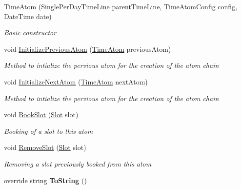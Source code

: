 \begin{DoxyCompactItemize}
\item 
\hyperlink{class_general_health_care_elements_1_1_booking_models_1_1_time_atom_a4cf1f306327fea9c66286912c9d7e1af}{Time\+Atom} (\hyperlink{class_general_health_care_elements_1_1_booking_models_1_1_single_per_day_time_line}{Single\+Per\+Day\+Time\+Line} parent\+Time\+Line, \hyperlink{class_general_health_care_elements_1_1_booking_models_1_1_time_atom_config}{Time\+Atom\+Config} config, Date\+Time date)
\begin{DoxyCompactList}\small\item\em Basic constructor \end{DoxyCompactList}\item 
void \hyperlink{class_general_health_care_elements_1_1_booking_models_1_1_time_atom_a68e6d2457b7f8d04c06e6e37d3ed267d}{Initialize\+Previous\+Atom} (\hyperlink{class_general_health_care_elements_1_1_booking_models_1_1_time_atom}{Time\+Atom} previous\+Atom)
\begin{DoxyCompactList}\small\item\em Method to intialize the pervious atom for the creation of the atom chain \end{DoxyCompactList}\item 
void \hyperlink{class_general_health_care_elements_1_1_booking_models_1_1_time_atom_ae13cc0e9665cfb0f479c97a64eb66e6d}{Initialize\+Next\+Atom} (\hyperlink{class_general_health_care_elements_1_1_booking_models_1_1_time_atom}{Time\+Atom} next\+Atom)
\begin{DoxyCompactList}\small\item\em Method to intialize the pervious atom for the creation of the atom chain \end{DoxyCompactList}\item 
void \hyperlink{class_general_health_care_elements_1_1_booking_models_1_1_time_atom_a3de39a66455acdb336e3c662d8c63a44}{Book\+Slot} (\hyperlink{class_general_health_care_elements_1_1_booking_models_1_1_slot}{Slot} slot)
\begin{DoxyCompactList}\small\item\em Booking of a slot to this atom \end{DoxyCompactList}\item 
void \hyperlink{class_general_health_care_elements_1_1_booking_models_1_1_time_atom_abd8551d4fa801fc342b5ce91513c57d1}{Remove\+Slot} (\hyperlink{class_general_health_care_elements_1_1_booking_models_1_1_slot}{Slot} slot)
\begin{DoxyCompactList}\small\item\em Removing a slot previously booked from this atom \end{DoxyCompactList}\item 
override string {\bfseries To\+String} ()\hypertarget{class_general_health_care_elements_1_1_booking_models_1_1_time_atom_a1d5197871af6e2edf6bff89cd1924193}{}\label{class_general_health_care_elements_1_1_booking_models_1_1_time_atom_a1d5197871af6e2edf6bff89cd1924193}

\end{DoxyCompactItemize}
